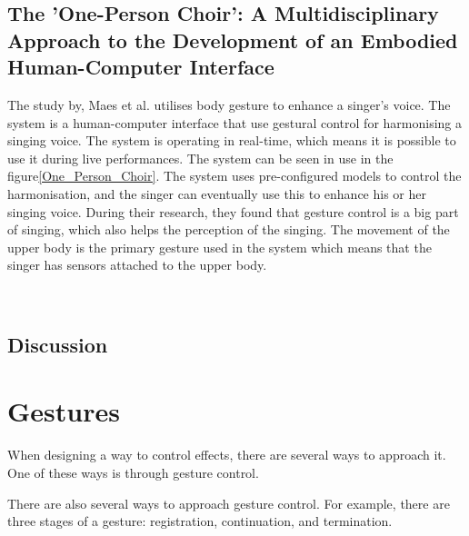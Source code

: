 \subsection{The 'One-Person Choir': A Multidisciplinary Approach to the Development of an Embodied Human-Computer Interface}
The study by, Maes et al. \citep{Maes_2011} utilises body gesture to enhance a singer's voice. The system is a human-computer interface that use gestural control for harmonising a singing voice. The system is operating in real-time, which means it is possible to use it during live performances. The system can be seen in use in the figure\ref{One_Person_Choir}. The system uses pre-configured models to control the harmonisation, and the singer can eventually use this to enhance his or her singing voice. 
During their research, they found that gesture control is a big part of singing, which also helps the perception of the singing. The movement of the upper body is the primary gesture used in the system which means that the singer has sensors attached to the upper body.\\

\begin{minipage}{\linewidth}%
\label{One_Person_Choir}
\end{minipage}\\

\subsection{Discussion}



\section{Gestures}

When designing a way to control effects, there are several ways to approach it. One of these ways is through gesture control.

There are also several ways to approach gesture control. For example, there are three stages of a gesture: registration, continuation, and termination\citep[pp. 127-134]{Wigdor_2011}.\\

\begin{minipage}{\linewidth}%
\label{Gestures}
\end{minipage}\\


